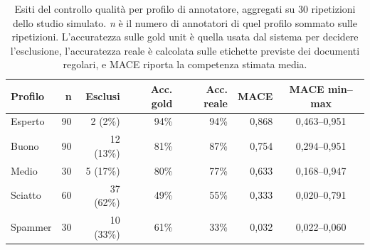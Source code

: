 \begin{table}[ht]
\centering
\small
\begin{tabular}{lrrrrrc}
\toprule
\textbf{Profilo} & \textbf{n} & \textbf{Esclusi} & \textbf{Acc. gold} & \textbf{Acc. reale} & \textbf{MACE} & \textbf{MACE min--max} \\
\midrule
Esperto  & 90 & 2 (2\%)   & 94\% & 94\% & 0,868 & 0,463--0,951 \\
Buono    & 90 & 12 (13\%) & 81\% & 87\% & 0,754 & 0,294--0,951 \\
Medio    & 30 & 5 (17\%)  & 80\% & 77\% & 0,633 & 0,168--0,947 \\
Sciatto  & 60 & 37 (62\%) & 49\% & 55\% & 0,333 & 0,020--0,791 \\
Spammer  & 30 & 10 (33\%) & 61\% & 33\% & 0,032 & 0,022--0,060 \\
\bottomrule
\end{tabular}
\caption{Esiti del controllo qualità per profilo di annotatore, aggregati su 30 ripetizioni dello studio simulato. \emph{n} è il numero di annotatori di quel profilo sommato sulle ripetizioni. L'accuratezza sulle gold unit è quella usata dal sistema per decidere l'esclusione, l'accuratezza reale è calcolata sulle etichette previste dei documenti regolari, e MACE riporta la competenza stimata media.}
\label{tab:simulazione-profili}
\end{table}
